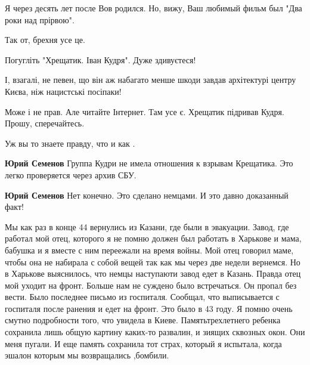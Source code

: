 \begin{itemize}
\begin{itemize}
\begin{itemize}
Я через десять лет после Вов родился. Но, вижу, Ваш любимый фильм был "Два роки
над прірвою".

Так от, брехня усе це.

Погугліть "Хрещатик. Іван Кудря". Дуже здивуєтеся!

І, взагалі, не певен, що він аж набагато менше шкоди завдав архітектурі центру
Києва, ніж нацистські посіпаки!

Може і не прав. Але читайте Інтернет. Там усе є. Хрещатик підривав Кудря.
Прошу, сперечайтесь.


 
Уж вы то знаете правду, что и как .
\end{itemize}

 
\textbf{Юрий Семенов} Группа Кудри не имела отношения к взрывам Крещатика. Это легко проверяется через архив СБУ.


 
\textbf{Юрий Семенов} Нет конечно. Это сделано немцами. И это давно доказанный факт!

\end{itemize}

 

Мы как раз в конце 44 вернулись из Казани, где были в эвакуации. Завод, где
работал мой отец, которого я не помню должен был работать в Харькове и
мама, бабушка и я вместе с ним переежали на время войны. Мой отец говорил
маме, чтобы она не набирала с собой вещей так как мы через две недели
вернемся. Но в Харькове выяснилось, что немцы наступаюти завод едет в
Казань. Правда отец мой уходит на фронт. Больше нам не суждено было
встречаться. Он пропал без вести. Было последнее письмо из госпиталя. Сообщал, что
выписывается с госпиталя после ранения и едет на фронт. Это было в 43 году. Я
помню очень смутно подробности того, что увидела в Киеве. Памятьтрехлетнего
ребенка сохранила лишь общую картину каких-то развалин, и зиящих сквозных
окон. Они меня пугали. И еще память сохранила тот страх, который я испытала, когда
эшалон которым мы возвращались ,бомбили.


\end{itemize}
